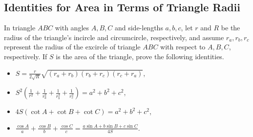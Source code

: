 \documentclass[12pt,a4paper]{memoir}
\theoremstyle{definition}
\begin{document}
\newpage
\subsection{Identities for Area in Terms of Triangle Radii}

	\begin{question}[name=Area in Terms of Radii]
		In triangle $ABC$ with angles $A,B,C$ and side-lengths $a,b,c$, let $r$ and $R$ be the radius of the triangle's incircle and circumcircle, respectively, and assume $r_a,r_b,r_c$ represent the radius of the excircle of triangle $ABC$ with respect to $A,B,C$, respectively.
		If $S$ is the area of the triangle, prove the following identities.
		\begin{itemize}
			\item $\displaystyle S=\frac{r}{2\sqrt R}\sqrt{(r_a+r_b)(r_b+r_c)(r_c+r_a)}$,
			\item $\displaystyle S^2\left(\frac{1}{r^2}+\frac{1}{r_a^2}+\frac{1}{r_b^2}+\frac{1}{r_c^2}\right) = a^2+b^2+c^2$,
			\item $4S(\cot A + \cot B + \cot C)=a^2+b^2+c^2$,
			\item $\displaystyle \frac{\cos A}{a} + \frac{\cos B}{b} + \frac{\cos C}{c} = \frac{a\sin A + b\sin B + c\sin C}{4S}$.
		\end{itemize}
	\end{question}
\end{document}
